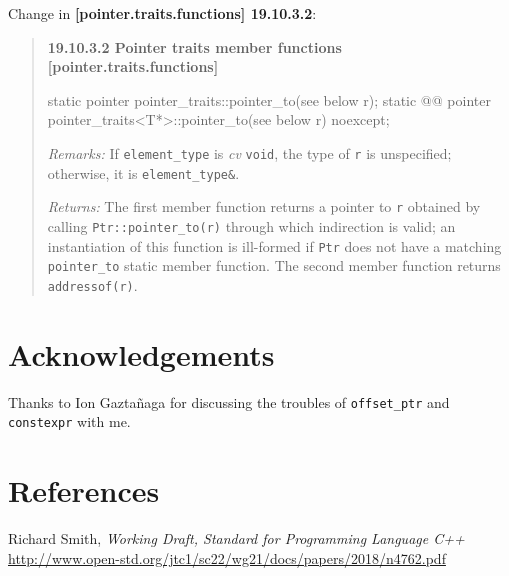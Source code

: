 \documentclass{wg21}
\newcommand{\cc}[1]{\texttt{#1}}
\begin{document}
Change in \textbf{[pointer.traits.functions] 19.10.3.2}:
\begin{quote}
\textbf{19.10.3.2 Pointer traits member functions [pointer.traits.functions]}

\begin{codeblock}
static pointer pointer_traits::pointer_to(see below r);
static @@ pointer pointer_traits<T*>::pointer_to(see below r) noexcept;
\end{codeblock}

\textit{Remarks:} If \texttt{element_type} is \textit{cv} \texttt{void}, the
type of \texttt{r} is unspecified; otherwise, it is \texttt{element_type\&}.

\textit{Returns:} The first member function returns a pointer to \texttt{r}
obtained by calling \texttt{Ptr::pointer_to(r)} through which indirection is
valid; an instantiation of this function is ill-formed if \texttt{Ptr} does
not have a matching \texttt{pointer_to} static member function. The second
member function returns \texttt{addressof(r)}.
\end{quote}


\section{Acknowledgements}
Thanks to Ion Gaztañaga for discussing the troubles of \cc{offset_ptr} and
\cc{constexpr} with me.


\section{References}
\renewcommand{\section}[2]{}%
\begin{thebibliography}{9}

  Richard Smith,
  \emph{Working Draft, Standard for Programming Language C++}\newline
  \url{http://www.open-std.org/jtc1/sc22/wg21/docs/papers/2018/n4762.pdf}

\end{thebibliography}
\end{document}
